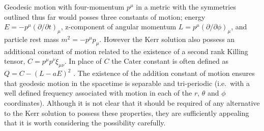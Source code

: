 Geodesic motion with four-momentum $p^{\mu}$ in a metric with the symmetries outlined thus far would posses three constants of motion; energy ${E=-p^{\mu}(\partial/\partial t)_{\mu}}$, z-component of angular momentum ${L=p^{\mu}(\partial/\partial \phi)_{\mu}}$, and particle rest mass ${m^{2}=-p^{\mu}p_{\mu}}$. However the Kerr solution also possess an additional constant of motion related to the existence of a second rank Killing tensor, ${C=p^{\mu}p^{\nu}\xi_{\mu\nu}}$. In place of $C$ the Cater constant is often defined as ${Q=C-(L-aE)^{2}}$ \citep{PhysRev.174.1559}. The existence of the addition constant of motion ensures that geodesic motion in the spacetime is separable and tri-periodic (i.e.\ with a well defined frequency associated with motion in each of the $r$, $\theta$ and $\phi$ coordinates). Although it is not clear that it should be required of any alternative to the Kerr solution to possess these properties, they are sufficiently appealing that it is worth considering the possibility carefully.

